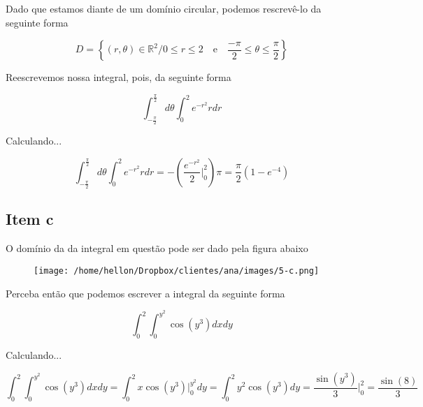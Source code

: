 \documentclass[
	article,			%
	11pt,				%
	oneside,			%
	a4paper,			%
	english,			%
	brazil,				%
	sumario=tradicional
	]{abntex2}
\begin{document}
		Dado que estamos diante de um domínio circular, podemos rescrevê-lo da seguinte forma

		$$ D=\left\{ \left( r,\theta \right) \in \mathbb{R} ^{2} / 0\leq r\leq 2 \quad \textrm{e} \quad \dfrac {-\pi } {2}\leq \theta \leq \dfrac {\pi } {2}\right\} $$

		Reescrevemos nossa integral, pois, da seguinte forma

		$$\int _{-\frac {\pi } {2}}^{\frac {\pi } {2}}d\theta \int _{0}^{2}e^{-r^{2}}rdr$$

		Calculando...

		$$\int _{-\frac {\pi } {2}}^{\frac {\pi } {2}}d\theta \int _{0}^{2}e^{-r^{2}}rdr = - \left(\dfrac{e^{-r^{2}}}{2}\biggr\rvert_{0}^{2}\right) \pi = \dfrac{\pi}{2}(1-e^{-4})$$

		\subsection*{Item c}

		O domínio da da integral em questão pode ser dado pela figura abaixo

		\begin{figure}[!ht]
			\centering
			\texttt{[image: /home/hellon/Dropbox/clientes/ana/images/5-c.png]}
		\end{figure}

		Perceba então que podemos escrever a integral da seguinte forma

		$$\int _{0}^{2} \int _{0}^{y^2} \cos\left(y^3 \right) dxdy$$

		Calculando...

		$$\int _{0}^{2} \int _{0}^{y^2} \cos\left(y^3 \right) dxdy =  \int _{0}^{2} x\cos\left(y^3 \right)\biggr\rvert_{0}^{y^2} dy  = \int _{0}^{2} y^2\cos\left(y^3 \right) dy =  \dfrac {\sin(y^3)}{3} \biggr\rvert_{0}^{2} = \dfrac {\sin(8)}{3}$$
\end{document}
